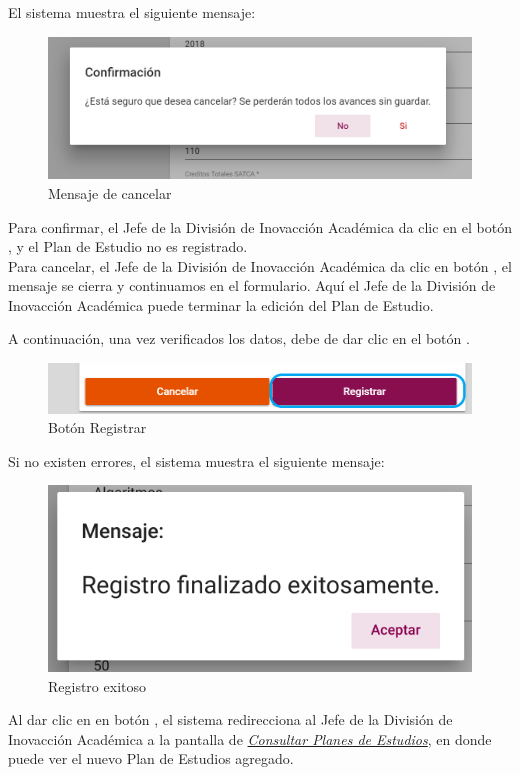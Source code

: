 El sistema muestra el siguiente mensaje:
\begin{figure}[H]
	\centering
	\hypertarget{ms1}{\includegraphics[width=0.7\linewidth]{images/SP4-GPE/m1}}
	\caption{Mensaje de cancelar}
	\label{ms1}
\end{figure}

Para confirmar,  el Jefe de la División de Inovacción Académica da clic en el botón  , y el Plan de Estudio no es registrado.\\

Para cancelar, el Jefe de la División de Inovacción Académica da clic en botón  , el mensaje se cierra y continuamos en el formulario. Aquí el Jefe de la División de Inovacción Académica puede terminar la edición del Plan de Estudio.

A continuación, una vez verificados los datos, debe de dar clic en el botón .
\begin{figure}[H]
	\centering
	\hypertarget{btnreg}{\includegraphics[width=0.7\linewidth]{images/SP4-GPE/registrarB}}
	\caption{Botón Registrar}
	\label{btnreg}
\end{figure}

Si no existen errores, el sistema muestra el siguiente mensaje:
	\begin{figure}[H]
	\centering
	\hypertarget{exito}{\includegraphics[width=0.7\linewidth]{images/SP4-GPE/exito}}
	\caption{Registro exitoso}
	\label{exito}
\end{figure}

Al dar clic en en botón , el sistema redirecciona  al Jefe de la División de Inovacción Académica a la pantalla de \hyperlink{consultarPE}{\textit{Consultar Planes de Estudios}}, en donde puede ver el nuevo Plan de Estudios agregado.\\
\newpage
